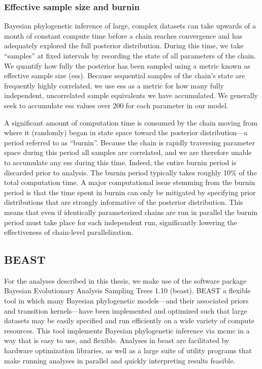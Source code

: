 \subsubsection{Effective sample size and burnin}
Bayesian phylogenetic inference of large, complex datasets can take upwards of a month of constant compute time before a chain reaches convergence and has adequately explored the full posterior distribution.
During this time, we take ``samples'' at fixed intervals by recording the state of all parameters of the chain.
We quantify how fully the posterior has been sampled using a metric known as effective sample size (\gls{ess}).
Because sequential samples of the chain's state are frequently highly correlated, we use \gls{ess} as a metric for how many fully independent, uncorrelated sample equivalents we have accumulated.
We generally seek to accumulate \gls{ess} values over 200 for each parameter in our model. 

A significant amount of computation time is consumed by the chain moving from where it (randomly) began in state space toward the posterior distribution---a period referred to as ``burnin''.
Because the chain is rapidly traversing parameter space during this period all samples are correlated, and we are therefore unable to accumulate any \gls{ess} during this time.
Indeed, the entire burnin period is discarded prior to analysis.
The burnin period typically takes roughly 10\% of the total computation time.
A major computational issue stemming from the burnin period is that the time spent in burnin can only be mitigated by specifying prior distributions that are strongly informative of the posterior distribution.
This means that even if identically parameterized chains are run in parallel the burnin period must take place for each independent run, significantly lowering the effectiveness of chain-level parallelization.


\subsection{BEAST}

For the analyses described in this thesis, we make use of the software package Bayesian Evolutionary Analysis Sampling Trees 1.10 \cite{beast} (\gls{beast}).
BEAST a flexible tool in which many Bayesian phylogenetic models---and their associated priors and transition kernels---have been implemented and optimized such that large datasets may be easily specified and run efficiently on a wide variety of compute resources.
This tool implements Bayesian phylogenetic inference via \gls{mcmc} in a way that is easy to use, and flexible.
Analyses in \gls{beast} are facilitated by hardware optimization libraries\cite{beagle}, as well as a large suite of utility programs that make running analyses in parallel and quickly interpreting results feasible.


